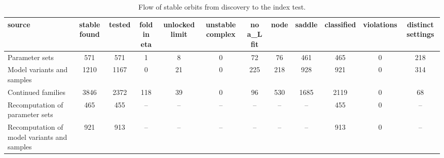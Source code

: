 \begin{table}
\caption{Flow of stable orbits from discovery to the index test.}
\label{tab:T_accounting}
\begin{ruledtabular}
\begin{tabular}{lccccccccccc}
source & stable found & tested & fold in eta & unlocked limit & unstable complex & no a_L fit & node & saddle & classified & violations & distinct settings \\
\hline
Parameter sets & 571 & 571 & 1 & 8 & 0 & 72 & 76 & 461 & 465 & 0 & 218 \\
Model variants and samples & 1210 & 1167 & 0 & 21 & 0 & 225 & 218 & 928 & 921 & 0 & 314 \\
Continued families & 3846 & 2372 & 118 & 39 & 0 & 96 & 530 & 1685 & 2119 & 0 & 68 \\
Recomputation of parameter sets & 465 & 455 & -- & -- & -- & -- & -- & -- & 455 & 0 & -- \\
Recomputation of model variants and samples & 921 & 913 & -- & -- & -- & -- & -- & -- & 913 & 0 & -- \\
\end{tabular}
\end{ruledtabular}
\end{table}
